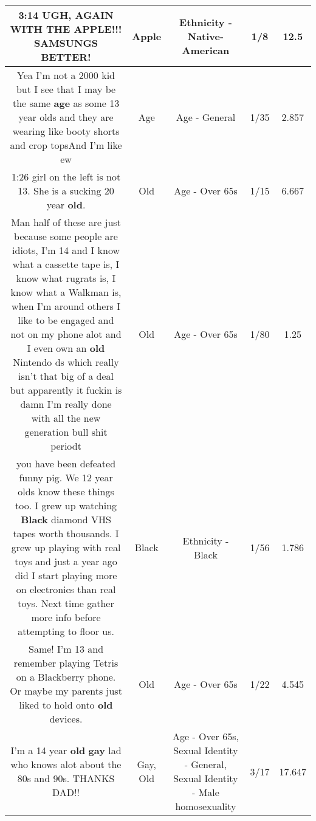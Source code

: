 \documentclass[11pt]{article}
\newlength\mylength
\begin{document}
\begin{center}
\begin{longtable}{|C{.65\mylength}|C{.30\mylength}|C{.12\mylength}|C{.12\mylength}|C{.12\mylength}|}
  \small 3:14 UGH, AGAIN WITH THE \textbf{APPLE}!!! SAMSUNGS BETTER!\normalsize   & Apple & Ethnicity - Native-American & 1/8 & 12.5 \\  \hline
  \small Yea I'm not a 2000 kid but I see that I may be the same \textbf{age} as some 13 year olds and they are wearing like booty shorts and crop topsAnd I'm like ew\normalsize   & Age & Age - General & 1/35 & 2.857 \\  \hline
  \small 1:26 girl on the left is not 13. She is a sucking 20 year \textbf{old}.\normalsize   & Old & Age - Over 65s & 1/15 & 6.667 \\  \hline
  \small Man half of these are just because some people are idiots, I'm 14 and I know what a cassette tape is, I know what rugrats is, I know what a Walkman is, when I'm around others I like to be engaged and not on my phone alot and I even own an \textbf{old} Nintendo ds which really isn't that big of a deal but apparently it fuckin is damn I'm really done with all the new generation bull shit periodt\normalsize   & Old & Age - Over 65s & 1/80 & 1.25 \\  \hline
  \small you have been defeated funny pig. We 12 year olds know these things too. I grew up watching \textbf{Black} diamond VHS tapes worth thousands. I grew up playing with real toys and just a year ago did I start playing more on electronics than real toys. Next time gather more info before attempting to floor us.\normalsize   & Black & Ethnicity - Black & 1/56 & 1.786 \\  \hline
  \small Same! I'm 13 and remember playing Tetris on a Blackberry phone. Or maybe my parents just liked to hold onto \textbf{old} devices.\normalsize   & Old & Age - Over 65s & 1/22 & 4.545 \\  \hline
  \small I'm a 14 year \textbf{old} \textbf{g\textbf{ay}} lad who knows alot about the 80s and 90s. THANKS DAD!!\normalsize   & Gay, Old & Age - Over 65s, Sexual Identity - General, Sexual Identity - Male homosexuality & 3/17 & 17.647 \\  \hline

\end{longtable}
\end{center}
\end{document}
